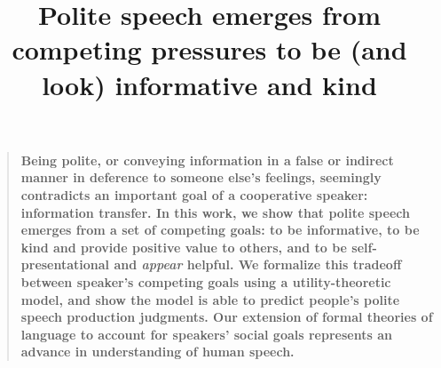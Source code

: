 \documentclass[12pt]{article}
\title{Polite speech emerges from competing pressures to be (and look)
informative and kind}
\author
%
{Erica J. Yoon,$^{1\ast\dagger}$ Michael Henry Tessler,$^{1\ast}$ Noah D. Goodman,$^{1}$ Michael C. Frank$^{1}$\\
\\
\normalsize{$^{1}$Department of Psychology, Stanford University,}\\
\normalsize{450 Serra Mall, Stanford, CA 94305.}
\\
\normalsize{$^\ast$These authors contributed equally to this work.}
\\
\normalsize{$^\dagger$To whom correspondence should be addressed; E-mail: ejyoon@stanford.edu.}
}
\date{}
\newenvironment{sciabstract}{%
\begin{quote} \bf}
{\end{quote}}
\begin{document}
 


\baselineskip24pt


\maketitle 






\begin{sciabstract}
Being polite, or conveying information in a false or indirect manner in
deference to someone else's feelings, seemingly contradicts an important
goal of a cooperative speaker: information transfer. In this work, we
show that polite speech emerges from a set of competing goals: to be
informative, to be kind and provide positive value to others, and to be
self-presentational and \emph{appear} helpful. We formalize this
tradeoff between speaker's competing goals using a utility-theoretic
model, and show the model is able to predict people's polite speech
production judgments. Our extension of formal theories of language to
account for speakers' social goals represents an advance in
understanding of human speech.
\end{sciabstract}
\end{document}
